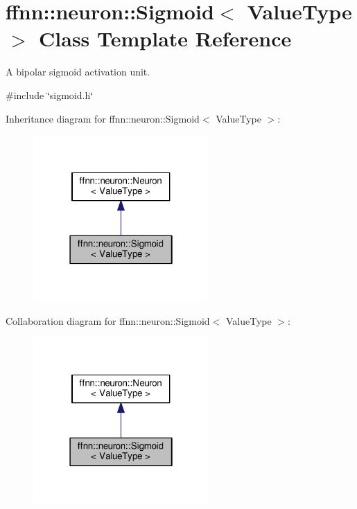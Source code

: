\hypertarget{classffnn_1_1neuron_1_1_sigmoid}{\section{ffnn\-:\-:neuron\-:\-:Sigmoid$<$ Value\-Type $>$ Class Template Reference}
\label{classffnn_1_1neuron_1_1_sigmoid}
}


A bipolar sigmoid activation unit.  




{\ttfamily \#include \char`\"{}sigmoid.\-h\char`\"{}}



Inheritance diagram for ffnn\-:\-:neuron\-:\-:Sigmoid$<$ Value\-Type $>$\-:
\nopagebreak
\begin{figure}[H]
\begin{center}
\leavevmode
\includegraphics[width=190pt]{classffnn_1_1neuron_1_1_sigmoid__inherit__graph}
\end{center}
\end{figure}


Collaboration diagram for ffnn\-:\-:neuron\-:\-:Sigmoid$<$ Value\-Type $>$\-:
\nopagebreak
\begin{figure}[H]
\begin{center}
\leavevmode
\includegraphics[width=190pt]{classffnn_1_1neuron_1_1_sigmoid__coll__graph}
\end{center}
\end{figure}
